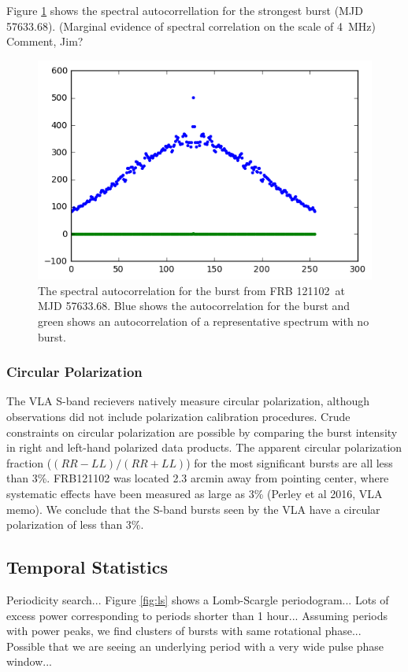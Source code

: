 \documentclass[twocolumn]{aastex61}
\newcommand{\frb}{FRB 121102}
\begin{document}
Figure \ref{fig:acf} shows the spectral autocorrellation for the strongest burst (MJD 57633.68). (Marginal evidence of spectral correlation on the scale of 4~MHz) {\color{red} Comment, Jim?}

\begin{figure}[htb]
\begin{center}
\includegraphics[width=0.9\columnwidth]{acf_57633_scan7}
\caption{The spectral autocorrelation for the burst from \frb\ at MJD 57633.68. Blue shows the autocorrelation for the burst and green shows an autocorrelation of a representative spectrum with no burst.
\label{fig:acf}}
\end{center}
\end{figure}

\subsubsection{Circular Polarization}
The VLA S-band recievers natively measure circular polarization, although observations did not include polarization calibration procedures. Crude constraints on circular polarization are possible by comparing the burst intensity in right and left-hand polarized data products. The apparent circular polarization fraction ($(RR-LL)/(RR+LL)$) for the most significant bursts are all less than 3\%. FRB121102 was located 2.3 arcmin away from pointing center, where systematic effects have been measured as large as 3\% (Perley et al 2016, VLA memo). We conclude that the S-band bursts seen by the VLA have a circular polarization of less than 3\%.

\subsection{Temporal Statistics}
Periodicity search...
Figure \ref{fig:ls} shows a Lomb-Scargle periodogram...
Lots of excess power corresponding to periods shorter than 1 hour...
Assuming periods with power peaks, we find clusters of bursts with same rotational phase...
Possible that we are seeing an underlying period with a very wide pulse phase window...
\end{document}
